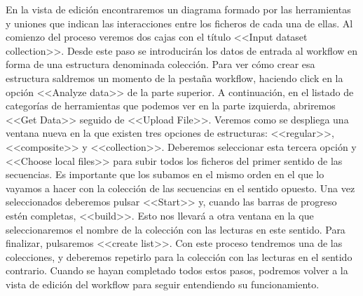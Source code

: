 En la vista de edición encontraremos un diagrama formado por las herramientas y uniones que indican las interacciones entre los ficheros de cada una de ellas. Al comienzo del proceso veremos dos cajas con el título <<Input dataset collection>>. Desde este paso se introducirán los datos de entrada al workflow en forma de una estructura denominada colección. Para ver cómo crear esa estructura saldremos un momento de la pestaña workflow, haciendo click en la opción <<Analyze data>> de la parte superior. A continuación, en el listado de categorías de herramientas que podemos ver en la parte izquierda, abriremos <<Get Data>> seguido de <<Upload File>>. Veremos como se despliega una ventana nueva en la que existen tres opciones de estructuras: <<regular>>, <<composite>> y <<collection>>. Deberemos seleccionar esta tercera opción y <<Choose local files>> para subir todos los ficheros del primer sentido de las secuencias. Es importante que los subamos en el mismo orden en el que lo vayamos a hacer con la colección de las secuencias en el sentido opuesto. Una vez seleccionados deberemos pulsar <<Start>> y, cuando las barras de progreso estén completas, <<build>>. Esto nos llevará a otra ventana en la que seleccionaremos el nombre de la colección con las lecturas en este sentido. Para finalizar, pulsaremos <<create list>>. Con este proceso tendremos una de las colecciones, y deberemos repetirlo para la colección con las lecturas en el sentido contrario. Cuando se hayan completado todos estos pasos, podremos volver a la vista de edición del workflow para seguir entendiendo su funcionamiento.


